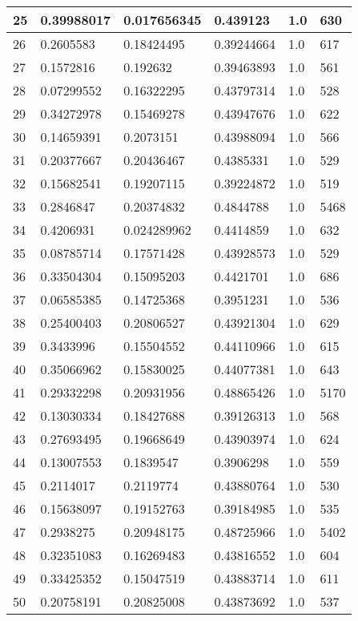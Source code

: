 \begin{longtable}{|l|l|l|l|l|l|}
25 & 0.39988017 & 0.017656345 & 0.439123 & 1.0 & 630 \\ \hline 
26 & 0.2605583 & 0.18424495 & 0.39244664 & 1.0 & 617 \\ \hline 
27 & 0.1572816 & 0.192632 & 0.39463893 & 1.0 & 561 \\ \hline 
28 & 0.07299552 & 0.16322295 & 0.43797314 & 1.0 & 528 \\ \hline 
29 & 0.34272978 & 0.15469278 & 0.43947676 & 1.0 & 622 \\ \hline 
30 & 0.14659391 & 0.2073151 & 0.43988094 & 1.0 & 566 \\ \hline 
31 & 0.20377667 & 0.20436467 & 0.4385331 & 1.0 & 529 \\ \hline 
32 & 0.15682541 & 0.19207115 & 0.39224872 & 1.0 & 519 \\ \hline 
33 & 0.2846847 & 0.20374832 & 0.4844788 & 1.0 & 5468 \\ \hline 
34 & 0.4206931 & 0.024289962 & 0.4414859 & 1.0 & 632 \\ \hline 
35 & 0.08785714 & 0.17571428 & 0.43928573 & 1.0 & 529 \\ \hline 
36 & 0.33504304 & 0.15095203 & 0.4421701 & 1.0 & 686 \\ \hline 
37 & 0.06585385 & 0.14725368 & 0.3951231 & 1.0 & 536 \\ \hline 
38 & 0.25400403 & 0.20806527 & 0.43921304 & 1.0 & 629 \\ \hline 
39 & 0.3433996 & 0.15504552 & 0.44110966 & 1.0 & 615 \\ \hline 
40 & 0.35066962 & 0.15830025 & 0.44077381 & 1.0 & 643 \\ \hline 
41 & 0.29332298 & 0.20931956 & 0.48865426 & 1.0 & 5170 \\ \hline 
42 & 0.13030334 & 0.18427688 & 0.39126313 & 1.0 & 568 \\ \hline 
43 & 0.27693495 & 0.19668649 & 0.43903974 & 1.0 & 624 \\ \hline 
44 & 0.13007553 & 0.1839547 & 0.3906298 & 1.0 & 559 \\ \hline 
45 & 0.2114017 & 0.2119774 & 0.43880764 & 1.0 & 530 \\ \hline 
46 & 0.15638097 & 0.19152763 & 0.39184985 & 1.0 & 535 \\ \hline 
47 & 0.2938275 & 0.20948175 & 0.48725966 & 1.0 & 5402 \\ \hline 
48 & 0.32351083 & 0.16269483 & 0.43816552 & 1.0 & 604 \\ \hline 
49 & 0.33425352 & 0.15047519 & 0.43883714 & 1.0 & 611 \\ \hline 
50 & 0.20758191 & 0.20825008 & 0.43873692 & 1.0 & 537 \\ \hline 
\end{longtable}